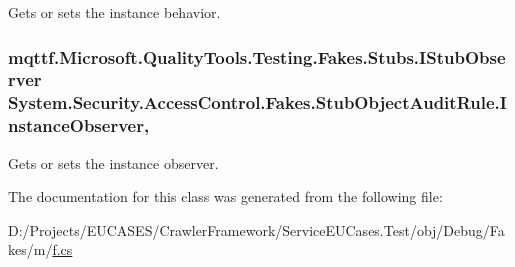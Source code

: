 Gets or sets the instance behavior.

\hypertarget{class_system_1_1_security_1_1_access_control_1_1_fakes_1_1_stub_object_audit_rule_a63d3e2eac240c42fc5125cbe7a26a573}{
\subsubsection[{Instance\-Observer}]{\setlength{\rightskip}{0pt plus 5cm}mqttf.\-Microsoft.\-Quality\-Tools.\-Testing.\-Fakes.\-Stubs.\-I\-Stub\-Observer System.\-Security.\-Access\-Control.\-Fakes.\-Stub\-Object\-Audit\-Rule.\-Instance\-Observer\hspace{0.3cm}{\ttfamily [get]}, {\ttfamily [set]}}}\label{class_system_1_1_security_1_1_access_control_1_1_fakes_1_1_stub_object_audit_rule_a63d3e2eac240c42fc5125cbe7a26a573}


Gets or sets the instance observer.



The documentation for this class was generated from the following file\-:\begin{DoxyCompactItemize}
\item 
D\-:/\-Projects/\-E\-U\-C\-A\-S\-E\-S/\-Crawler\-Framework/\-Service\-E\-U\-Cases.\-Test/obj/\-Debug/\-Fakes/m/\hyperlink{m_2f_8cs}{f.\-cs}\end{DoxyCompactItemize}
